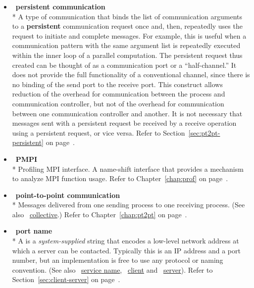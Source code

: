 \begin{itemize}
\label{glossary:persistent_communication}
\item  ~\hypertarget{glossary:persistent_communication}{\textbf{persistent communication}} \\*
A type of communication that binds the list of communication arguments to a {\bf persistent} communication
request once and, then, repeatedly uses
the request to initiate and complete messages.
For example, this is useful when
a communication pattern with the same argument list is repeatedly
executed within the inner loop of a parallel computation.   The
persistent request thus created can be thought of as a
communication port or a ``half-channel.''
It does not provide the full functionality of a conventional channel,
since there is no binding of the send port to the receive port. This
construct allows reduction of the overhead for communication
between the process and communication controller, but not of the overhead for
communication between one communication controller and another.
It is not necessary that messages sent with a persistent request be received
by a receive operation using a persistent request, or vice versa.
Refer to Section~\ref{sec:pt2pt-persistent} on page~\pageref{sec:pt2pt-persistent}.

\label{glossary:PMPI}
\item  ~\hypertarget{glossary:PMPI}{\textbf{PMPI}} \\*
Profiling MPI interface. A name-shift interface that provides a mechanism to analyze MPI function usage.
Refer to Chapter~\ref{chap:prof} on page~\pageref{chap:prof}.

\label{glossary:point-to-point communication}
\item  ~\hypertarget{glossary:point-to-point_communication}{\textbf{point-to-point communication}} \\*
Messages delivered from one sending process to one receiving process. (See also ~\hyperlink{glossary:collective}{collective}.)
Refer to Chapter~\ref{chap:pt2pt} on page~\pageref{chap:pt2pt}.

\label{glossary:port_name}
\item  ~\hypertarget{glossary:port_name}{\textbf{port name}} \\*
A  is a {\em system-supplied} string that encodes a
low-level network address at which a server can be
contacted. Typically this is an IP address and a port number, but an
implementation is free to use any protocol or naming convention.
(See also ~\hyperlink{glossary:service_name}{service name},
~\hyperlink{glossary:client}{client} and ~\hyperlink{glossary:server}{server}). 
Refer to Section~\ref{sec:client-server} on page~\pageref{sec:client-server}.


\end{itemize}

